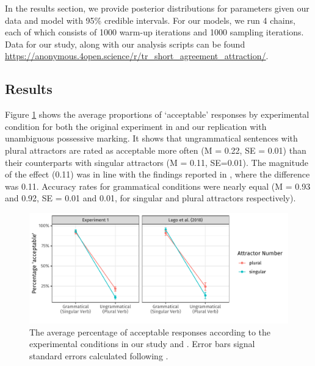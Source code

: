 \documentclass[brill,linguex]{glossa}\usepackage[]{graphicx}\usepackage[]{color}
\makeatletter
\def\maxwidth{ %
  \ifdim\Gin@nat@width>\linewidth
    \linewidth
  \else
    \Gin@nat@width
  \fi
}
\newenvironment{knitrout}{}{} %
\makeatother
\begin{document}
In the results section, we provide posterior distributions for parameters given our data and model with 95\% credible intervals. For our models, we run 4 chains, each of which consists of 1000 warm-up iterations and 1000 sampling iterations. Data for our study, along with our analysis scripts can be found \url{https://anonymous.4open.science/r/tr_short_agreement_attraction/}.


\subsection{Results}



Figure \ref{fig:AverageResponses} shows the average proportions of `acceptable' responses by experimental condition for both the original experiment in \citet{LagoEtAl:2019} and our replication with unambiguous possessive marking. It shows that ungrammatical sentences with plural attractors are rated as acceptable more often (M = 0.22, SE = 0.01) than their counterparts with singular attractors (M = 0.11, SE=0.01). The magnitude of the effect (0.11) was in line with the findings reported in \citet{LagoEtAl:2019}, where the difference was 0.11. Accuracy rates for grammatical conditions were nearly equal (M = 0.93 and 0.92, SE = 0.01 and 0.01, for singular and plural attractors respectively).

\begin{figure}[hbt!]
\centering

\begin{knitrout}
\color{fgcolor}

{\centering \includegraphics[width=\maxwidth]{figure/AverageResponses-1} 

}


\end{knitrout}

\caption{The average percentage of acceptable responses according to the experimental conditions in our study and \citet{LagoEtAl:2019}. Error bars signal standard errors calculated following \citet{Cousineau:2007}.}
\label{fig:AverageResponses}
\end{figure}
\end{document}

